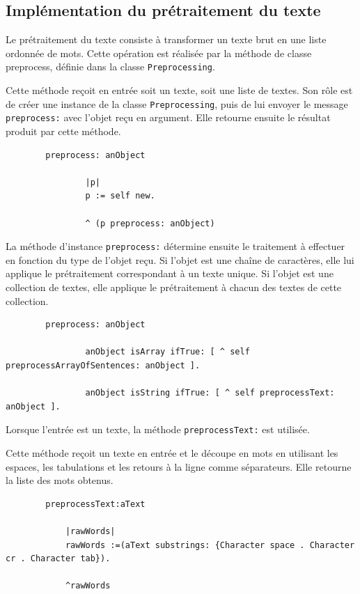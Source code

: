 \documentclass[12pt,a4paper]{report}
\begin{document}
	\subsection{Implémentation du prétraitement du texte}
	
	Le prétraitement du texte consiste à transformer un texte brut en une liste ordonnée de mots. Cette opération est réalisée par la méthode de classe preprocess, définie dans la classe \texttt{Preprocessing}.
	
	Cette méthode reçoit en entrée soit un texte, soit une liste de textes. Son rôle est de créer une instance de la classe \texttt{Preprocessing}, puis de lui envoyer le message \texttt{preprocess:} avec l'objet reçu en argument. Elle retourne ensuite le résultat produit par cette méthode.
	
	\begin{verbatim}
		preprocess: anObject	
		
				|p|	
				p := self new.
					
				^ (p preprocess: anObject)
	\end{verbatim}
	
	La méthode d'instance \texttt{preprocess:} détermine ensuite le traitement à effectuer en fonction du type de l'objet reçu. Si l'objet est une chaîne de caractères, elle lui applique le prétraitement correspondant à un texte unique. Si l'objet est une collection de textes, elle applique le prétraitement à chacun des textes de cette collection.
	
	\begin{verbatim}
		preprocess: anObject
		
				anObject isArray ifTrue: [ ^ self preprocessArrayOfSentences: anObject ].
			
				anObject isString ifTrue: [ ^ self preprocessText: anObject ].
	\end{verbatim}
	
	Lorsque l'entrée est un texte, la méthode \texttt{preprocessText:} est utilisée.
	
	Cette méthode reçoit un texte en entrée et le découpe en mots en utilisant les espaces, les tabulations et les retours à la ligne comme séparateurs. Elle retourne la liste des mots obtenus.
	
	\begin{verbatim}
		preprocessText:aText
			
			|rawWords|	
			rawWords :=(aText substrings: {Character space . Character cr . Character tab}).	
			
			^rawWords
	\end{verbatim}
	
\end{document}
